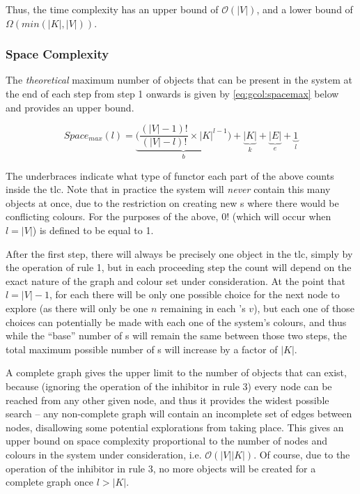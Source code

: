 Thus, the time complexity has an upper bound of \(\mathcal{O}(|V|)\), and a lower bound of \(\Omega(min(|K|, |V|))\).

\subsubsection{Space Complexity}

The \emph{theoretical} maximum number of objects that can be present in the system at the end of each step from step 1 onwards is given by \autoref{eq:gcol:spacemax} below and provides an upper bound.

\begin{equation}\label{eq:gcol:spacemax}
    Space_{max}(l) = \underbrace{\bigg(\frac{(|V| - 1)!}{(|V| - l)!} \times |K|^{l-1}\bigg)}_{b} + \underbrace{|K|}_{k} + \underbrace{|E|}_{e} + \underbrace{1}_{l}
\end{equation}

The underbraces indicate what type of functor each part of the above counts inside the \gls{tlc}.  Note that in practice the system will \emph{never} contain this many objects at once, due to the restriction on creating new \bo{}s where there would be conflicting colours.  For the purposes of the above, \(0!\) (which will occur when \(l = |V|\)) is defined to be equal to 1.

After the first step, there will always be precisely one \bo{} object in the \gls{tlc}, simply by the operation of rule 1, but in each proceeding step the count will depend on the exact nature of the graph and colour set under consideration.  At the point that \(l = |V| - 1\), for each \bo{} there will be only one possible choice for the next node to explore (as there will only be one \(n\) remaining in each \bo{}'s \(v\)), but each one of those choices can potentially be made with each one of the system's colours, and thus while the ``base'' number of \bo{}s will remain the same between those two steps, the total maximum possible number of \bo{}s will increase by a factor of \(|K|\).

A complete graph gives the upper limit to the number of objects that can exist, because (ignoring the operation of the inhibitor in rule 3) every node can be reached from any other given node, and thus it provides the widest possible search -- any non-complete graph will contain an incomplete set of edges between nodes, disallowing some potential explorations from taking place.  This gives an upper bound on space complexity proportional to the number of nodes and colours in the system under consideration, i.e. \(\mathcal{O}(|V||K|)\).  Of course, due to the operation of the inhibitor in rule 3, no more \bo{} objects will be created for a complete graph once \(l > |K|\).


